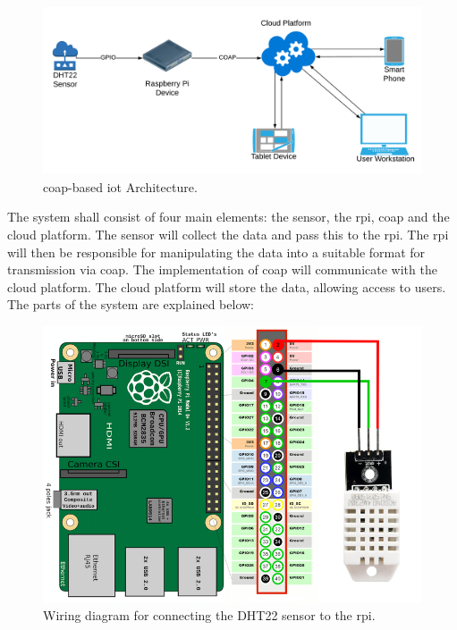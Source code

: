 \begin{figure}[H]
    \centering
    \includegraphics[width=\imageWidth\textwidth]{assets/Project_Framework.png}
    \caption{\label{fig:coap_iot_architecture} \gls{coap}-based \gls{iot} Architecture.}
\end{figure}

The system shall consist of four main elements: the sensor, the \gls{rpi}, 
\gls{coap} and the cloud platform.
The sensor will collect the data and pass this to the \gls{rpi}. 
The \gls{rpi} will then be responsible for manipulating
the data into a suitable format for transmission via \gls{coap}. 
The implementation of \gls{coap} will communicate with
the cloud platform. The cloud platform will store the data, 
allowing access to users.
The parts of the system are explained below:

\begin{figure}[H]
    \centering
   \includegraphics[width=\imageWidth\textwidth]{assets/rpi_wiring.png}
    \caption{\label{fig:rpi_wiring} Wiring diagram for connecting the DHT22 sensor to the \gls{rpi}.}
\end{figure}

